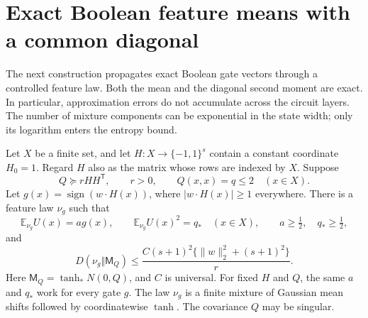 \section{Exact Boolean feature means with a common diagonal}
\label{sec:exact-feature-repair}

The next construction propagates exact Boolean gate vectors through a
controlled feature law. Both the mean and the diagonal second moment
are exact. In particular, approximation errors do not accumulate across
the circuit layers. The number of mixture components can be exponential
in the state width; only its logarithm enters the entropy bound.

\begin{lemma}
\label{lem:exact-feature-repair}
Let $X$ be a finite set, and let $H:X\to\{-1,1\}^s$ contain a
constant coordinate $H_0=1$. Regard $H$ also as the matrix whose rows
are indexed by $X$. Suppose
\[
 Q\succeq rHH^{\mathsf T},\qquad r>0,
 \qquad Q(x,x)=q\le2\quad(x\in X).
\]
Let $g(x)=\operatorname{sign}(w\cdot H(x))$, where
$|w\cdot H(x)|\ge1$ everywhere. There is a feature law $\nu_g$ such
that
\[
 \mathbb E_{\nu_g}U(x)=a g(x),\qquad
 \mathbb E_{\nu_g}U(x)^2=q_*\quad(x\in X),
 \qquad a\ge\tfrac12,\quad q_*\ge\tfrac12,
\]
and
\[
 D(\nu_g\Vert\mathsf M_Q)
 \le \frac{C(s+1)^2\{\|w\|_2^2+(s+1)^2\}}r.
\]
Here $\mathsf M_Q=\tanh_*N(0,Q)$, and $C$ is universal. For fixed
$H$ and $Q$, the same $a$ and $q_*$ work for every gate $g$.
The law $\nu_g$ is a finite mixture of Gaussian mean shifts followed
by coordinatewise $\tanh$. The covariance $Q$ may be singular.
\end{lemma}

